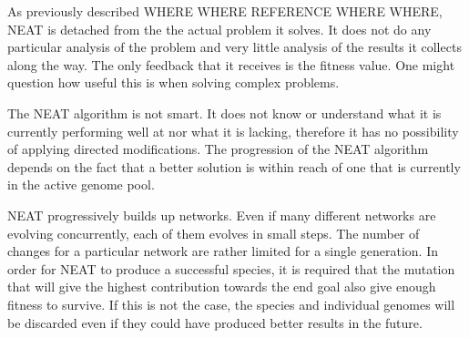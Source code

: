 
As previously described WHERE WHERE REFERENCE WHERE WHERE, NEAT is detached from the the actual problem it solves. It does not do any particular analysis of the problem and very little analysis of the results it collects along the way. The only feedback that it receives is the fitness value. One might question how useful this is when solving complex problems.

The NEAT algorithm is not smart. It does not know or understand what it is currently performing well at nor what it is lacking, therefore it has no possibility of applying directed modifications. The progression of the NEAT algorithm depends on the fact that a better solution is within reach of one that is currently in the active genome pool.

NEAT progressively builds up networks. Even if many different networks are evolving concurrently, each of them evolves in small steps. The number of changes for a particular network are rather limited for a single generation. In order for NEAT to produce a successful species, it is required that the mutation that will give the highest contribution towards the end goal also give enough fitness to survive. If this is not the case, the species and individual genomes will be discarded even if they could have produced better results in the future. 

